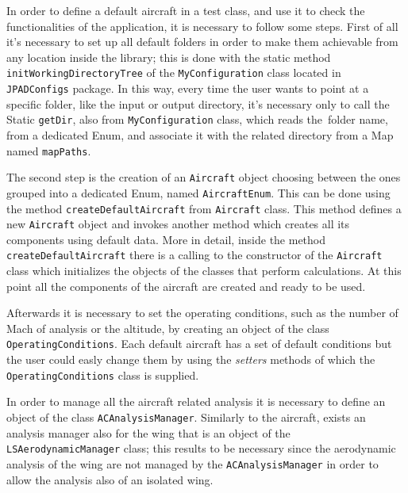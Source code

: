 \bigskip
\noindent
In order to define a default aircraft in a test class, and use it to check the functionalities of the application, it is necessary to follow some steps. First of all it’s necessary to set up all default folders in order to make them achievable from any location inside the library; this is done with the static method \lstinline[language=Java]!initWorkingDirectoryTree! of the \lstinline[language=Java]!MyConfiguration! class located in \lstinline[language=Java]!JPADConfigs! package. In this way, every time the user wants to point at a specific folder, like the input or output directory, it’s necessary only to call the \gls{Static} \lstinline[language=Java]!getDir!, also from \lstinline[language=Java]!MyConfiguration! class, which reads the~folder name, from a dedicated \gls{Enum}, and associate it with the related directory from a \gls{Map} named \lstinline[language=Java]!mapPaths!.

\bigskip
\noindent
The second step is the creation of an \lstinline[language=Java]!Aircraft! object choosing between the ones grouped into a dedicated \gls{Enum}, named \lstinline[language=Java]!AircraftEnum!. This can be done using the method \lstinline[language=Java]!createDefaultAircraft! from \lstinline[language=Java]!Aircraft! class. This method defines a new \lstinline[language=Java]!Aircraft! object and invokes another method which creates all its components using default data. More in detail, inside the method \lstinline[language=Java]!createDefaultAircraft! there is a calling to the constructor of the \lstinline[language=Java]!Aircraft! class which initializes the objects of the classes that perform calculations. At this point all the components of the aircraft are created and ready to be used.

\bigskip
\noindent
Afterwards it is necessary to set the operating conditions, such as the number of Mach of analysis or the altitude, by creating an object of the class \lstinline[language=Java]!OperatingConditions!. Each default aircraft has a set of default conditions but the user could easly change them by using the \emph{setters} methods of which the \lstinline[language=Java]!OperatingConditions! class is supplied.

\bigskip
\noindent
In order to manage all the aircraft related analysis it is necessary to define an object of the class \lstinline[language=Java]!ACAnalysisManager!. Similarly to the aircraft, exists an analysis manager also for the wing that is an object of the \lstinline[language=Java]!LSAerodynamicManager! class; this results to be necessary since the aerodynamic analysis of the wing are not managed by the \lstinline[language=Java]!ACAnalysisManager! in order to allow the analysis also of an isolated wing.

